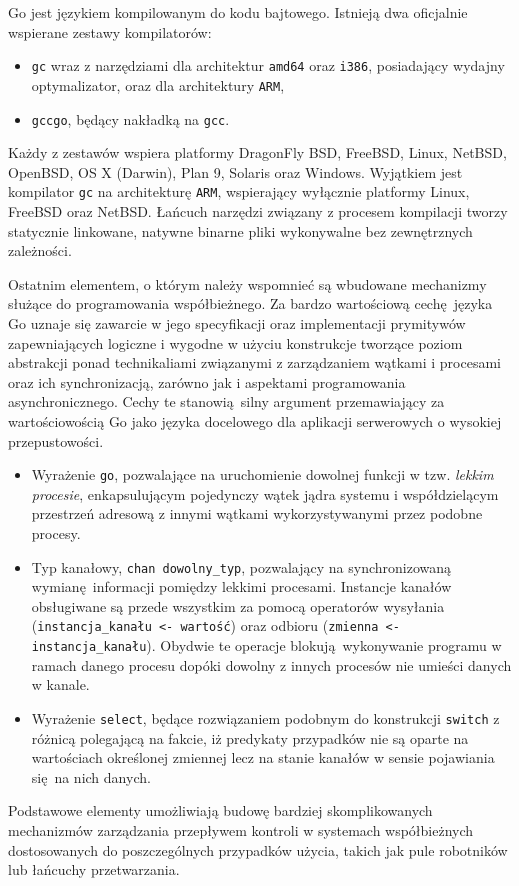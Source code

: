 \par{
  Go jest językiem kompilowanym do kodu bajtowego. Istnieją dwa oficjalnie wspierane zestawy kompilatorów:
  \begin{itemize}
    \item \texttt{gc} wraz z narzędziami dla architektur \texttt{amd64} oraz \texttt{i386}, posiadający wydajny optymalizator, oraz dla architektury \texttt{ARM},
    \item \texttt{gccgo}, będący nakładką na \texttt{gcc}.
  \end{itemize}
  Każdy z zestawów wspiera platformy DragonFly BSD, FreeBSD, Linux, NetBSD, OpenBSD, OS X (Darwin), Plan 9, Solaris oraz Windows. Wyjątkiem jest kompilator \texttt{gc} na architekturę \texttt{ARM}, wspierający wyłącznie platformy Linux, FreeBSD oraz NetBSD. \cite{godoc:compilers}
  Łańcuch narzędzi związany z procesem kompilacji tworzy statycznie linkowane, natywne binarne pliki wykonywalne bez zewnętrznych zależności.
}

\par{
  Ostatnim elementem, o którym należy wspomnieć są wbudowane mechanizmy służące do programowania współbieżnego.
  Za bardzo wartościową cechę języka Go uznaje się zawarcie w jego specyfikacji oraz implementacji prymitywów zapewniających logiczne i wygodne w użyciu konstrukcje tworzące poziom abstrakcji ponad technikaliami związanymi z zarządzaniem wątkami i procesami oraz ich synchronizacją, zarówno jak i aspektami programowania asynchronicznego.
  Cechy te stanowią silny argument przemawiający za wartościowością Go jako języka docelowego dla aplikacji serwerowych o wysokiej przepustowości.
  \begin{itemize}
    \item Wyrażenie \texttt{go}, pozwalające na uruchomienie dowolnej funkcji w tzw. \emph{lekkim procesie}, enkapsulującym pojedynczy wątek jądra systemu i współdzielącym przestrzeń adresową z innymi wątkami wykorzystywanymi przez podobne procesy.
    \item Typ kanałowy, \texttt{chan dowolny\_typ}, pozwalający na synchronizowaną wymianę informacji pomiędzy lekkimi procesami. Instancje kanałów obsługiwane są przede wszystkim za pomocą operatorów wysyłania (\texttt{instancja\_kanału <- wartość}) oraz odbioru (\texttt{zmienna <- instancja\_kanału}). Obydwie te operacje blokują wykonywanie programu w ramach danego procesu dopóki dowolny z innych procesów nie umieści danych w kanale.
    \item Wyrażenie \texttt{select}, będące rozwiązaniem podobnym do konstrukcji \texttt{switch} z różnicą polegającą na fakcie, iż predykaty przypadków nie są oparte na wartościach określonej zmiennej lecz na stanie kanałów w sensie pojawiania się na nich danych.
  \end{itemize}
  Podstawowe elementy umożliwiają budowę bardziej skomplikowanych mechanizmów zarządzania przepływem kontroli w systemach współbieżnych dostosowanych do poszczególnych przypadków użycia, takich jak pule robotników lub łańcuchy przetwarzania.
}